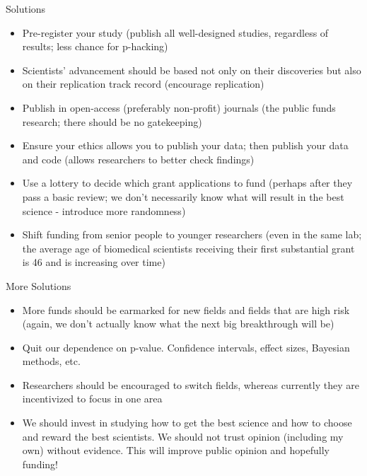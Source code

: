 \documentclass{beamer}
\begin{document}
\begin{frame}{Solutions}

	\begin{itemize}
		\item Pre-register your study (publish all well-designed studies, regardless of results; less chance for p-hacking)
		\item<2-> Scientists' advancement should be based not only on their discoveries but also on their replication track record (encourage replication)
		\item<3-> Publish in open-access (preferably non-profit) journals (the public funds research; there should be no gatekeeping)
		\item<4-> Ensure your ethics allows you to publish your data; then publish your data and code (allows researchers to better check findings) 
		\item<5-> Use a lottery to decide which grant applications to fund (perhaps after they pass a basic review; we don't necessarily know what will result in the best science - introduce more randomness)
		\item<6-> Shift funding from senior people to younger researchers (even in the same lab; the average age of biomedical scientists receiving their first substantial grant is 46 and is increasing over time)
	\end{itemize}
	
\end{frame}

\begin{frame}{More Solutions}

	\begin{itemize}
		\item More funds should be earmarked for new fields and fields that are high risk (again, we don't actually know what the next big breakthrough will be)
		\item<2-> Quit our dependence on p-value. Confidence intervals, effect sizes, Bayesian methods, etc.
		\item<3-> Researchers should be encouraged to switch fields, whereas currently they are incentivized to focus in one area
		\item<4-> We should invest in studying how to get the best science and how to choose and reward the best scientists. We should not trust opinion (including my own) without evidence. This will improve public opinion and hopefully funding!
	\end{itemize}
	
\end{frame}
\end{document}
